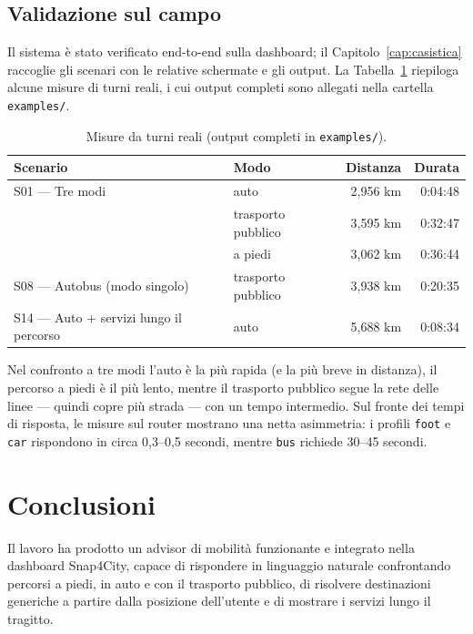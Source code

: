 \documentclass[a4paper,oneside]{Tptesi2}
\begin{document}
\section{Validazione sul campo}

Il sistema \`e stato verificato end-to-end sulla dashboard; il
Capitolo~\ref{cap:casistica} raccoglie gli scenari con le relative schermate e gli output.
La Tabella~\ref{tab:misure} riepiloga alcune misure di turni reali, i cui output completi
sono allegati nella cartella \texttt{examples/}.

\begin{table}[htbp]
  \centering
  \begin{tabular}{llrr}
    \toprule
    \textbf{Scenario} & \textbf{Modo} & \textbf{Distanza} & \textbf{Durata} \\
    \midrule
    S01 --- Tre modi         & auto              & 2,956 km & 0:04:48 \\
                             & trasporto pubblico& 3,595 km & 0:32:47 \\
                             & a piedi           & 3,062 km & 0:36:44 \\
    \midrule
    S08 --- Autobus (modo singolo)           & trasporto pubblico & 3,938 km & 0:20:35 \\
    S14 --- Auto + servizi lungo il percorso & auto               & 5,688 km & 0:08:34 \\
    \bottomrule
  \end{tabular}
  \caption{Misure da turni reali (output completi in \texttt{examples/}).}
  \label{tab:misure}
\end{table}

Nel confronto a tre modi l'auto \`e la pi\`u rapida (e la pi\`u breve in distanza), il
percorso a piedi \`e il pi\`u lento, mentre il trasporto pubblico segue la rete delle
linee --- quindi copre pi\`u strada --- con un tempo intermedio. Sul fronte dei tempi di
risposta, le misure sul router
mostrano una netta asimmetria: i profili \texttt{foot} e \texttt{car} rispondono in
circa 0,3--0,5 secondi, mentre \texttt{bus} richiede 30--45 secondi.

\chapter{Conclusioni}

Il lavoro ha prodotto un advisor di mobilit\`a funzionante e integrato nella dashboard
Snap4City, capace di rispondere in linguaggio naturale confrontando percorsi a piedi,
in auto e con il trasporto pubblico, di risolvere destinazioni generiche a partire dalla
posizione dell'utente e di mostrare i servizi lungo il tragitto.
\end{document}
